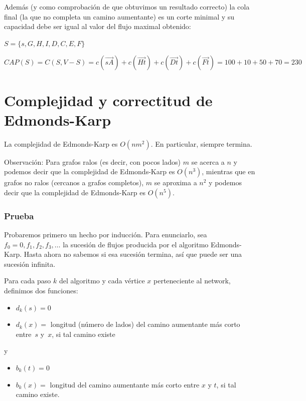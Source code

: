 \documentclass[10pt,a4paper]{article}
\begin{document}
Además (y como comprobación de que obtuvimos un resultado correcto) la cola final (la que no completa un camino aumentante) es un corte minimal y su capacidad debe ser igual al valor del flujo maximal obtenido:


$S= \{s, G, H, I, D, C, E, F\}$

$CAP(S) = C(S, V- S) = c(\overrightarrow{sA}) + c(\overrightarrow{Ht}) + c(\overrightarrow{Dt}) + c(\overrightarrow{Ft}) = 100 + 10 + 50 + 70 = 230$

\section*{Complejidad y correctitud de Edmonds-Karp}

La complejidad de Edmonds-Karp es $O(nm^2)$. En particular, siempre termina.

Observación: Para grafos ralos (es decir, con pocos lados) $m$ se acerca a $n$ y podemos decir que la complejidad de Edmonds-Karp es $O(n^3)$, mientras que en grafos no ralos (cercanos a grafos completos), $m$ se aproxima a $n^2$ y podemos decir que la complejidad de Edmonds-Karp es $O(n^5)$.

\subsubsection*{Prueba}

Probaremos primero un hecho por inducción. Para enunciarlo, sea $f_0 = 0, f_1, f_2, f_3, \dots$ la sucesión de flujos producida por el algoritmo Edmonds-Karp. Hasta ahora no sabemos si esa sucesión termina, así que puede ser una sucesión infinita.

Para cada paso $k$ del algoritmo y cada vértice $x$ perteneciente al network, definimos dos funciones:

\begin{itemize}

	\item $d_k(s) = 0$
	\item $d_k(x) = $ longitud (número de lados) del camino aumentante más corto entre $s$ y $x$, si tal camino existe
\end{itemize}

y

\begin{itemize}

	\item $b_k(t) = 0$
	\item $b_k(x) = $ longitud del camino aumentante más corto entre $x$ y $t$, si tal camino existe.
\end{itemize}
\end{document}
